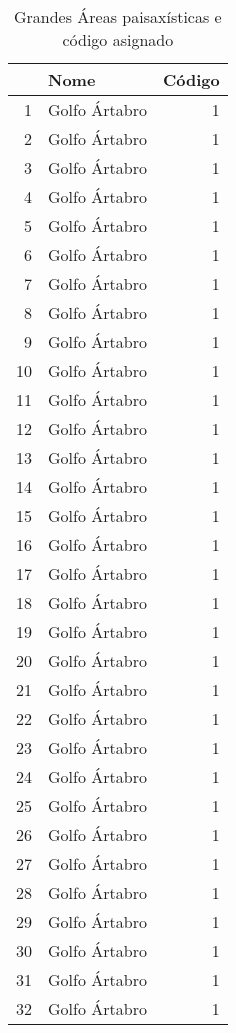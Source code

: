 \begin{table}[p]
\centering
\caption{Grandes Áreas paisaxísticas e código asignado} 
\label{xtaboa0}
\begin{tabular}{rlr}
  \hline
 & Nome & Código \\ 
  \hline
1 & Golfo Ártabro &   1 \\ 
  2 & Golfo Ártabro &   1 \\ 
  3 & Golfo Ártabro &   1 \\ 
  4 & Golfo Ártabro &   1 \\ 
  5 & Golfo Ártabro &   1 \\ 
  6 & Golfo Ártabro &   1 \\ 
  7 & Golfo Ártabro &   1 \\ 
  8 & Golfo Ártabro &   1 \\ 
  9 & Golfo Ártabro &   1 \\ 
  10 & Golfo Ártabro &   1 \\ 
  11 & Golfo Ártabro &   1 \\ 
  12 & Golfo Ártabro &   1 \\ 
  13 & Golfo Ártabro &   1 \\ 
  14 & Golfo Ártabro &   1 \\ 
  15 & Golfo Ártabro &   1 \\ 
  16 & Golfo Ártabro &   1 \\ 
  17 & Golfo Ártabro &   1 \\ 
  18 & Golfo Ártabro &   1 \\ 
  19 & Golfo Ártabro &   1 \\ 
  20 & Golfo Ártabro &   1 \\ 
  21 & Golfo Ártabro &   1 \\ 
  22 & Golfo Ártabro &   1 \\ 
  23 & Golfo Ártabro &   1 \\ 
  24 & Golfo Ártabro &   1 \\ 
  25 & Golfo Ártabro &   1 \\ 
  26 & Golfo Ártabro &   1 \\ 
  27 & Golfo Ártabro &   1 \\ 
  28 & Golfo Ártabro &   1 \\ 
  29 & Golfo Ártabro &   1 \\ 
  30 & Golfo Ártabro &   1 \\ 
  31 & Golfo Ártabro &   1 \\ 
  32 & Golfo Ártabro &   1 \\ 

\end{tabular}
\end{table}
